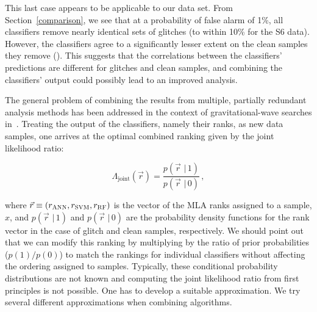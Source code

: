 \documentclass[prd, twocolumn, lengthcheck, superscriptaddress, showpacs, letterpaper, nofootinbib]{revtex4-1}
\newcommand\given{\,\,|\,}
\newcommand\auxvec{x}
\newcommand\ANNrank{r_{\textsc{ANN}}}
\newcommand\SVMrank{r_{\textsc{SVM}}}
\newcommand\RFrank{r_{\textsc{RF}}}
\newcommand\vecrank{\vec{r}}
\begin{document}
This last case appears to be applicable to our data set. From Section~\ref{comparison}, we see that at a probability of false alarm of 1\%, all classifiers remove nearly identical sets of glitches (to within 10\% for the S6 data). However, the classifiers agree to a significantly lesser extent on the clean samples they remove (). This suggests that the correlations between the classifiers' predictions are different for glitches and clean samples, and combining the classifiers' output could possibly lead to an improved analysis.

The general problem of combining the results from multiple, partially redundant analysis methods has been addressed in the context of gravitational-wave searches in~\cite{Biswas2012b}. Treating the output of the classifiers, namely their ranks, as new data samples, one arrives at the optimal combined ranking given by the joint likelihood ratio:

\begin{equation}
\label{joint_lr}
\Lambda_{\mathrm{joint}}(\vecrank) = \frac{p(\vecrank \given 1)}{p(\vecrank \given 0)}\,,
\end{equation}  

\noindent where $\vecrank \equiv (\ANNrank, \SVMrank, \RFrank)$ is the vector of the \ac{MLA} ranks assigned to a sample, $\auxvec$, and $p(\vecrank \given 1)$  and $p(\vecrank \given 0)$ are the probability density functions for the rank vector in the case of glitch and clean samples, respectively. We should point out that we can modify this ranking by multiplying by the ratio of prior probabilities ($p(1)/p(0)$) to match the rankings for individual classifiers without affecting the ordering assigned to samples. Typically, these conditional probability distributions are not known and computing the joint likelihood ratio from first principles is not possible. One has to develop a suitable approximation. We try several different approximations when combining algorithms.
\end{document}
